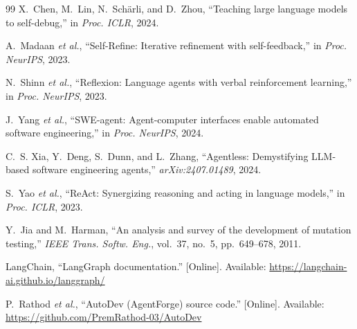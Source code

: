 \documentclass[conference,letterpaper]{IEEEtran}
\begin{document}
\begin{thebibliography}{99}
X.~Chen, M.~Lin, N.~Sch\"arli, and D.~Zhou, ``Teaching large language models to
self-debug,'' in \emph{Proc. ICLR}, 2024.

A.~Madaan \emph{et al.}, ``Self-Refine: Iterative refinement with
self-feedback,'' in \emph{Proc. NeurIPS}, 2023.

N.~Shinn \emph{et al.}, ``Reflexion: Language agents with verbal reinforcement
learning,'' in \emph{Proc. NeurIPS}, 2023.

J.~Yang \emph{et al.}, ``SWE-agent: Agent-computer interfaces enable automated
software engineering,'' in \emph{Proc. NeurIPS}, 2024.

C.~S. Xia, Y.~Deng, S.~Dunn, and L.~Zhang, ``Agentless: Demystifying LLM-based
software engineering agents,'' \emph{arXiv:2407.01489}, 2024.

S.~Yao \emph{et al.}, ``ReAct: Synergizing reasoning and acting in language
models,'' in \emph{Proc. ICLR}, 2023.

Y.~Jia and M.~Harman, ``An analysis and survey of the development of mutation
testing,'' \emph{IEEE Trans. Softw. Eng.}, vol.~37, no.~5, pp.~649--678, 2011.

LangChain, ``LangGraph documentation.'' [Online]. Available:
\url{https://langchain-ai.github.io/langgraph/}

P.~Rathod \emph{et al.}, ``AutoDev (AgentForge) source code.'' [Online].
Available: \url{https://github.com/PremRathod-03/AutoDev}

\end{thebibliography}
\end{document}
